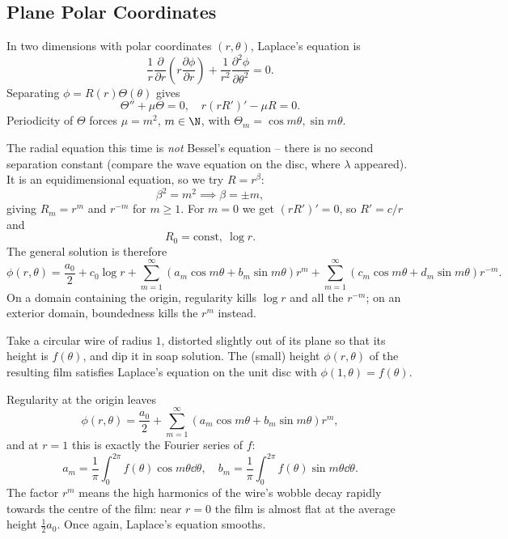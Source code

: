 \subsection{Plane Polar Coordinates}

In two dimensions with polar coordinates $(r, \theta)$, Laplace's equation is
$$
\frac{1}{r}\frac{\partial}{\partial r}\left(r \frac{\partial \phi}{\partial r}\right) + \frac{1}{r^2}\frac{\partial^2 \phi}{\partial \theta^2} = 0.
$$
Separating $\phi = R(r) \Theta(\theta)$ gives
$$
\Theta'' + \mu \Theta = 0, \quad r (r R')' - \mu R = 0.
$$
Periodicity of $\Theta$ forces $\mu = m^2$, $m \in \N$, with $\Theta_m = \cos m \theta, \sin m \theta$.

The radial equation this time is \emph{not} Bessel's equation -- there is no second separation constant (compare the wave equation on the disc, where $\lambda$ appeared). It is an equidimensional equation, so we try $R = r^\beta$:
$$
\beta^2 = m^2 \implies \beta = \pm m,
$$
giving $R_m = r^m$ and $r^{-m}$ for $m \geq 1$. For $m = 0$ we get $(rR')' = 0$, so $R' = c/r$ and
$$
R_0 = \text{const}, \ \log r.
$$
The general solution is therefore
$$
\phi(r, \theta) = \frac{a_0}{2} + c_0 \log r + \sum_{m = 1}^{\infty} (a_m \cos m \theta + b_m \sin m \theta) r^m + \sum_{m = 1}^{\infty} (c_m \cos m \theta + d_m \sin m \theta) r^{-m}.
$$
On a domain containing the origin, regularity kills $\log r$ and all the $r^{-m}$; on an exterior domain, boundedness kills the $r^m$ instead.

\begin{example}
    Take a circular wire of radius $1$, distorted slightly out of its plane so that its height is $f(\theta)$, and dip it in soap solution. The (small) height $\phi(r, \theta)$ of the resulting film satisfies Laplace's equation on the unit disc with $\phi(1, \theta) = f(\theta)$.

    Regularity at the origin leaves
    $$
    \phi(r, \theta) = \frac{a_0}{2} + \sum_{m = 1}^{\infty}\left(a_m \cos m \theta + b_m \sin m\theta\right) r^m,
    $$
    and at $r = 1$ this is exactly the Fourier series of $f$:
    $$
    a_m = \frac{1}{\pi} \int_0^{2 \pi} f(\theta) \cos m \theta \dd \theta, \quad b_m = \frac{1}{\pi} \int_0^{2\pi} f(\theta) \sin m \theta \dd \theta.
    $$
    The factor $r^m$ means the high harmonics of the wire's wobble decay rapidly towards the centre of the film: near $r = 0$ the film is almost flat at the average height $\frac{1}{2}a_0$. Once again, Laplace's equation smooths.
\end{example}

